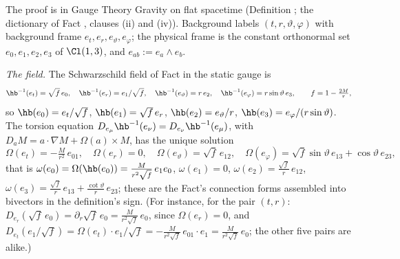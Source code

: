 The proof is in Gauge Theory Gravity on flat spacetime (Definition ; the dictionary of Fact , clauses (ii) and (iv)). Background labels $(t, r, \vartheta, \varphi)$ with background frame $e_t, e_r, e_\vartheta, e_\varphi$; the physical frame is the constant orthonormal set $e_0, e_1, e_2, e_3$ of $\Cl(1,3)$, and $e_{ab} := e_a \wedge e_b$.

\emph{The field.} The Schwarzschild field of Fact  in the static gauge is
\[
\hb^{-1}(e_t) = \sqrt f\,e_0, \quad \hb^{-1}(e_r) = e_1/\sqrt f, \quad \hb^{-1}(e_\vartheta) = r\,e_2, \quad \hb^{-1}(e_\varphi) = r\sin\vartheta\,e_3, \qquad f = 1 - \tfrac{2M}{r},
\]
so $\hb(e_0) = e_t/\sqrt f$, $\hb(e_1) = \sqrt f\,e_r$, $\hb(e_2) = e_\vartheta/r$, $\hb(e_3) = e_\varphi/(r\sin\vartheta)$. The torsion equation $D_{e_\mu}\hb^{-1}(e_\nu) = D_{e_\nu}\hb^{-1}(e_\mu)$, with $D_a M = a\cdot\nabla M + \Omega(a)\times M$, has the unique solution
\[
\Omega(e_t) = -\tfrac{M}{r^{2}}\,e_{01}, \quad \Omega(e_r) = 0, \quad \Omega(e_\vartheta) = \sqrt f\,e_{12}, \quad \Omega(e_\varphi) = \sqrt f\sin\vartheta\,e_{13} + \cos\vartheta\,e_{23},
\]
that is $\omega(e_0) = \Omega(\hb(e_0)) = \tfrac{M}{r^{2}\sqrt f}\,e_1e_0$, $\omega(e_1) = 0$, $\omega(e_2) = \tfrac{\sqrt f}{r}\,e_{12}$, $\omega(e_3) = \tfrac{\sqrt f}{r}\,e_{13} + \tfrac{\cot\vartheta}{r}\,e_{23}$; these are the Fact's connection forms assembled into bivectors in the definition's sign. (For instance, for the pair $(t, r)$: $D_{e_r}(\sqrt f\,e_0) = \partial_r\sqrt f\,e_0 = \tfrac{M}{r^{2}\sqrt f}\,e_0$, since $\Omega(e_r) = 0$, and $D_{e_t}(e_1/\sqrt f) = \Omega(e_t)\cdot e_1/\sqrt f = -\tfrac{M}{r^{2}\sqrt f}\,e_{01}\cdot e_1 = \tfrac{M}{r^{2}\sqrt f}\,e_0$; the other five pairs are alike.)

